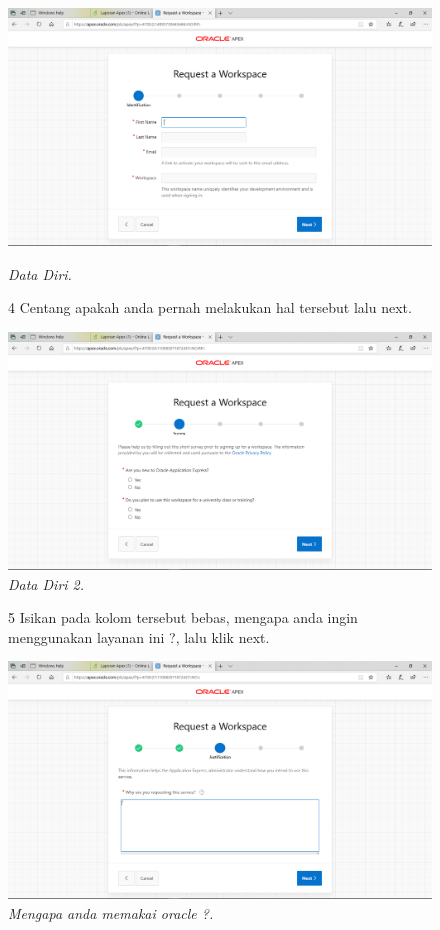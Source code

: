 \begin{enumerate}
\begin{figure}[!htbp]
    \begin{center}
\includegraphics[scale=0.2]{figures/001.png}
    \caption{\textit{Data Diri.}}
        \end{center}
        
\item[4]Centang apakah anda pernah melakukan hal tersebut lalu next.  

    \begin{center}
\includegraphics[scale=0.2]{figures/002.png}
    \caption{\textit{Data Diri 2.}}
        \end{center}
        \end{figure}
\begin{figure}
\item[5]Isikan pada kolom tersebut bebas, mengapa anda ingin menggunakan layanan ini ?, lalu klik next.

    \begin{center}
\includegraphics[scale=0.2]{figures/003.png}
    \caption{\textit{Mengapa anda memakai oracle ?.}}
        \end{center}


\end{figure}
\end{enumerate}
